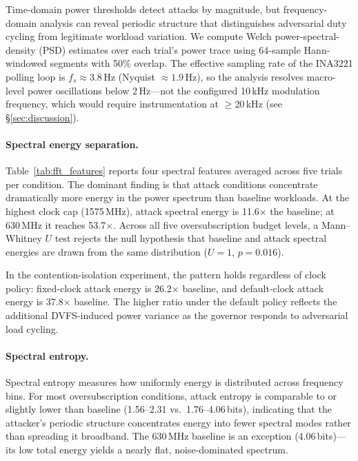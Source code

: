 Time-domain power thresholds detect attacks by magnitude, but
frequency-domain analysis can reveal periodic structure that
distinguishes adversarial duty cycling from legitimate workload
variation.  We compute Welch power-spectral-density (PSD) estimates
over each trial's power trace using 64-sample Hann-windowed segments
with 50\% overlap.  The effective sampling rate of the INA3221 polling
loop is $f_s \approx 3.8$\,Hz (Nyquist $\approx 1.9$\,Hz), so the
analysis resolves macro-level power oscillations below 2\,Hz---not the
configured 10\,kHz modulation frequency, which would require
instrumentation at $\ge$20\,kHz (see \S\ref{sec:discussion}).

\paragraph{Spectral energy separation.}
Table~\ref{tab:fft_features} reports four spectral features averaged
across five trials per condition.  The dominant finding is that attack
conditions concentrate dramatically more energy in the power spectrum
than baseline workloads.  At the highest clock cap (1575\,MHz), attack
spectral energy is 11.6$\times$ the baseline; at 630\,MHz it reaches
53.7$\times$.  Across all five oversubscription budget levels, a
Mann--Whitney $U$ test rejects the null hypothesis that baseline and
attack spectral energies are drawn from the same distribution
($U = 1$, $p = 0.016$).

In the contention-isolation experiment, the pattern holds regardless
of clock policy: fixed-clock attack energy is 26.2$\times$ baseline,
and default-clock attack energy is 37.8$\times$ baseline.  The higher
ratio under the default policy reflects the additional DVFS-induced
power variance as the governor responds to adversarial load cycling.

\paragraph{Spectral entropy.}
Spectral entropy measures how uniformly energy is distributed across
frequency bins.  For most oversubscription conditions, attack entropy
is comparable to or slightly lower than baseline (1.56--2.31 vs.\
1.76--4.06\,bits), indicating that the attacker's periodic structure
concentrates energy into fewer spectral modes rather than spreading it
broadband.  The 630\,MHz baseline is an exception (4.06\,bits)---its
low total energy yields a nearly flat, noise-dominated spectrum.

